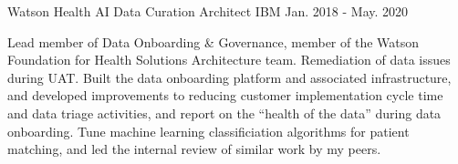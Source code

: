 \begin{cventries}
  \cventry
    {Watson Health} %
    {AI Data Curation Architect} %
    {IBM} %
    {Jan. 2018 - May. 2020} %
    {
      \begin{cvparagraph}
        Lead member of Data Onboarding \& Governance, member of the Watson Foundation for Health Solutions Architecture team.  Remediation of data issues during UAT.  Built the data onboarding platform and associated infrastructure, and developed improvements to reducing customer implementation cycle time and data triage activities, and report on the “health of the data” during data onboarding.  Tune machine learning classificiation algorithms for patient matching, and led the internal review of similar work by my peers.
      \end{cvparagraph}
    }


\end{cventries}
